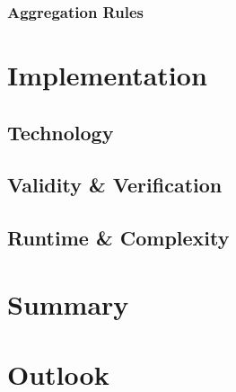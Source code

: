 \subsubsection{Aggregation Rules}

\section{Implementation}
\subsection{Technology}
\subsection{Validity \& Verification}
\label{subsec:validation}
\subsection{Runtime \& Complexity}

\section{Summary}
\section{Outlook}
\label{subsec:secgoal}